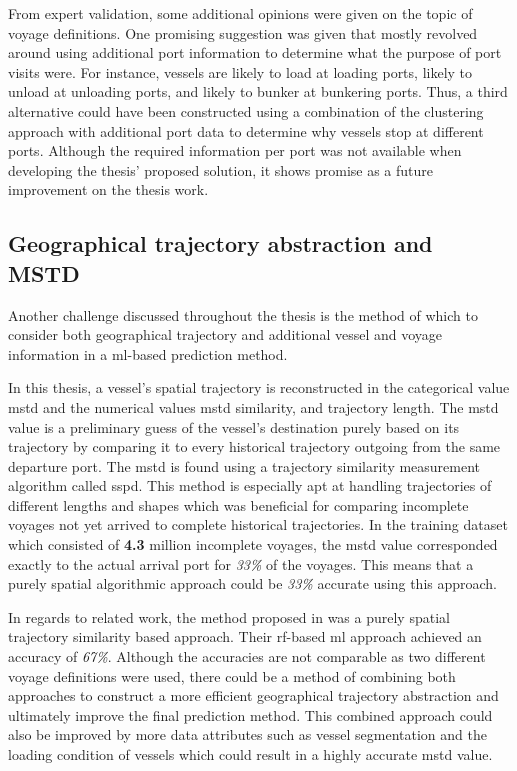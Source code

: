 From expert validation, some additional opinions were given on the topic of voyage definitions. One promising suggestion was given that mostly revolved around using additional port information to determine what the purpose of port visits were. For instance, vessels are likely to load at loading ports, likely to unload at unloading ports, and likely to bunker at bunkering ports. Thus, a third alternative could have been constructed using a combination of the clustering approach with additional port data to determine why vessels stop at different ports. Although the required information per port was not available when developing the thesis' proposed solution, it shows promise as a future improvement on the thesis work.

\subsection{Geographical trajectory abstraction and MSTD}

Another challenge discussed throughout the thesis is the method of which to consider both geographical trajectory and additional vessel and voyage information in a \acrfull{ml}-based prediction method.

In this thesis, a vessel's spatial trajectory is reconstructed in the categorical value \acrfull{mstd} and the numerical values \acrshort{mstd} similarity, and trajectory length. The \acrshort{mstd} value is a preliminary guess of the vessel's destination purely based on its trajectory by comparing it to every historical trajectory outgoing from the same departure port. The \acrshort{mstd} is found using a trajectory similarity measurement algorithm called \acrfull{sspd}. This method is especially apt at handling trajectories of different lengths and shapes which was beneficial for comparing incomplete voyages not yet arrived to complete historical trajectories. In the training dataset which consisted of \textbf{4.3} million incomplete voyages, the \acrshort{mstd} value corresponded exactly to the actual arrival port for \textit{33\%} of the voyages. This means that a purely spatial algorithmic approach could be \textit{33\%} accurate using this approach.

In regards to related work, the method proposed in \cite{Zhang2020AISApproach} was a purely spatial trajectory similarity based approach. Their \acrfull{rf}-based \acrshort{ml} approach achieved an accuracy of \textit{67\%}. Although the accuracies are not comparable as two different voyage definitions were used, there could be a method of combining both approaches to construct a more efficient geographical trajectory abstraction and ultimately improve the final prediction method. This combined approach could also be improved by more data attributes such as vessel segmentation and the loading condition of vessels which could result in a highly accurate \acrshort{mstd} value.

